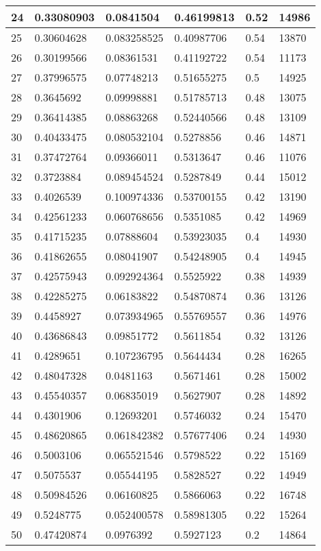 \begin{longtable}{|l|l|l|l|l|l|}
24 & 0.33080903 & 0.0841504 & 0.46199813 & 0.52 & 14986 \\ \hline 
25 & 0.30604628 & 0.083258525 & 0.40987706 & 0.54 & 13870 \\ \hline 
26 & 0.30199566 & 0.08361531 & 0.41192722 & 0.54 & 11173 \\ \hline 
27 & 0.37996575 & 0.07748213 & 0.51655275 & 0.5 & 14925 \\ \hline 
28 & 0.3645692 & 0.09998881 & 0.51785713 & 0.48 & 13075 \\ \hline 
29 & 0.36414385 & 0.08863268 & 0.52440566 & 0.48 & 13109 \\ \hline 
30 & 0.40433475 & 0.080532104 & 0.5278856 & 0.46 & 14871 \\ \hline 
31 & 0.37472764 & 0.09366011 & 0.5313647 & 0.46 & 11076 \\ \hline 
32 & 0.3723884 & 0.089454524 & 0.5287849 & 0.44 & 15012 \\ \hline 
33 & 0.4026539 & 0.100974336 & 0.53700155 & 0.42 & 13190 \\ \hline 
34 & 0.42561233 & 0.060768656 & 0.5351085 & 0.42 & 14969 \\ \hline 
35 & 0.41715235 & 0.07888604 & 0.53923035 & 0.4 & 14930 \\ \hline 
36 & 0.41862655 & 0.08041907 & 0.54248905 & 0.4 & 14945 \\ \hline 
37 & 0.42575943 & 0.092924364 & 0.5525922 & 0.38 & 14939 \\ \hline 
38 & 0.42285275 & 0.06183822 & 0.54870874 & 0.36 & 13126 \\ \hline 
39 & 0.4458927 & 0.073934965 & 0.55769557 & 0.36 & 14976 \\ \hline 
40 & 0.43686843 & 0.09851772 & 0.5611854 & 0.32 & 13126 \\ \hline 
41 & 0.4289651 & 0.107236795 & 0.5644434 & 0.28 & 16265 \\ \hline 
42 & 0.48047328 & 0.0481163 & 0.5671461 & 0.28 & 15002 \\ \hline 
43 & 0.45540357 & 0.06835019 & 0.5627907 & 0.28 & 14892 \\ \hline 
44 & 0.4301906 & 0.12693201 & 0.5746032 & 0.24 & 15470 \\ \hline 
45 & 0.48620865 & 0.061842382 & 0.57677406 & 0.24 & 14930 \\ \hline 
46 & 0.5003106 & 0.065521546 & 0.5798522 & 0.22 & 15169 \\ \hline 
47 & 0.5075537 & 0.05544195 & 0.5828527 & 0.22 & 14949 \\ \hline 
48 & 0.50984526 & 0.06160825 & 0.5866063 & 0.22 & 16748 \\ \hline 
49 & 0.5248775 & 0.052400578 & 0.58981305 & 0.22 & 15264 \\ \hline 
50 & 0.47420874 & 0.0976392 & 0.5927123 & 0.2 & 14864 \\ \hline 
\end{longtable}